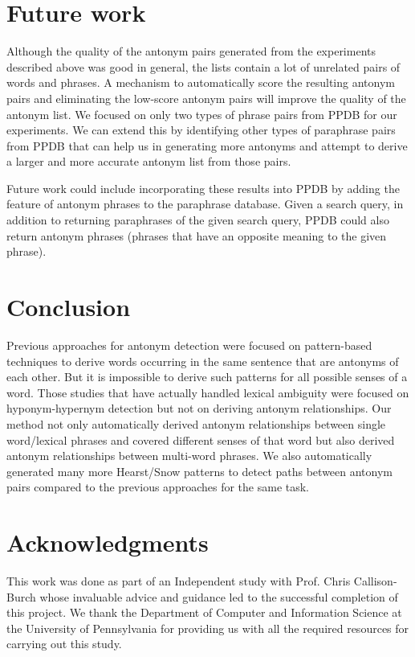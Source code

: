 \documentclass[11pt]{article}
\begin{document}
\section{Future work}
Although the quality of the antonym pairs generated from the experiments described above was good in general, the lists contain a lot of unrelated pairs of words and phrases. A mechanism to automatically score the resulting antonym pairs and eliminating the low-score antonym pairs will improve the quality of the antonym list. We focused on only two types of phrase pairs from PPDB for our experiments. We can extend this by identifying other types of paraphrase pairs from PPDB that can help us in generating more antonyms and attempt to derive a larger and more accurate antonym list from those pairs.

Future work could include incorporating these results into PPDB by adding the feature of antonym phrases to the paraphrase database. Given a search query, in addition to returning paraphrases of the given search query, PPDB could also return antonym phrases (phrases that have an opposite meaning to the given phrase).

\section{Conclusion}
Previous approaches for antonym detection were focused on pattern-based techniques to derive words occurring in the same sentence that are antonyms of each other. But it is impossible to derive such patterns for all possible senses of a word. Those studies that have actually handled lexical ambiguity were focused on hyponym-hypernym detection but not on deriving antonym relationships. Our method not only automatically derived antonym relationships between single word/lexical phrases and covered different senses of that word but also derived antonym relationships between multi-word phrases. We also automatically generated many more Hearst/Snow patterns to detect paths between antonym pairs compared to the previous approaches for the same task.

\section*{Acknowledgments}
This work was done as part of an Independent study with Prof. Chris Callison-Burch whose invaluable advice and guidance led to the successful completion of this project. We thank the Department of Computer and Information Science at the University of Pennsylvania for providing us with all the required resources for carrying out this study.
\end{document}
